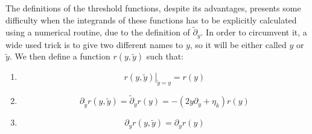 The definitions of the threshold functions, despite its advantages, presents some difficulty when the integrands of these functions has to be explicitly calculated using a numerical routine, due to the definition of $\widetilde{\partial}_y$.
In order to circumvent it, a wide used trick is to give two different names to $y$, so it will be either called $y$ or $\widetilde{y}$. We then define a function $r(y, \widetilde{y})$ such that:
\begin{enumerate}
 \item $$\left. r(y, \widetilde{y})\right|_{\widetilde{y} = y} = r(y)$$ 
 \item $$\partial_{\widetilde{y}} r(y, \widetilde{y}) = \widetilde{\partial}_y r(y) = -(2y\partial_y + \eta_k)r(y)$$
 \item $$\partial_y r(y, \widetilde{y}) = \partial_y r(y)$$
\end{enumerate}














